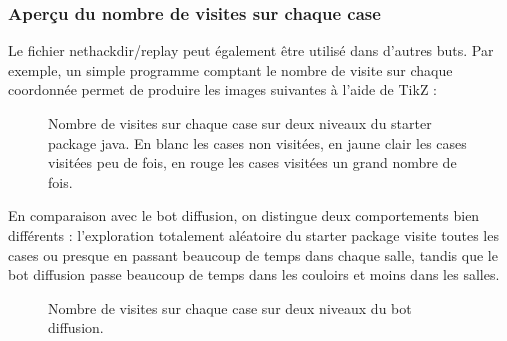 \documentclass[a4paper,12pt]{article}
\begin{document}
\subsubsection{Aperçu du nombre de visites sur chaque case}

Le fichier nethackdir/replay peut également être utilisé dans d'autres buts.
Par exemple, un simple programme comptant le nombre de visite sur chaque
coordonnée permet de produire les images suivantes à l'aide de TikZ :

\begin{figure}[H]
	\caption{Nombre de visites sur chaque case sur deux niveaux du starter
	package java. En blanc les cases non visitées, en jaune clair les cases
visitées peu de fois, en rouge les cases visitées un grand nombre de fois.}
	\resizebox{\columnwidth}{!}{}
\end{figure}

En comparaison avec le bot diffusion, on distingue deux comportements bien
différents : l'exploration totalement aléatoire du starter package visite
toutes les cases ou presque en passant beaucoup de temps dans chaque salle,
tandis que le bot diffusion passe beaucoup de temps dans les couloirs et moins
dans les salles.

\begin{figure}[H]
	\caption{Nombre de visites sur chaque case sur deux niveaux du bot diffusion.}
	\resizebox{\columnwidth}{!}{}
\end{figure}
\end{document}
